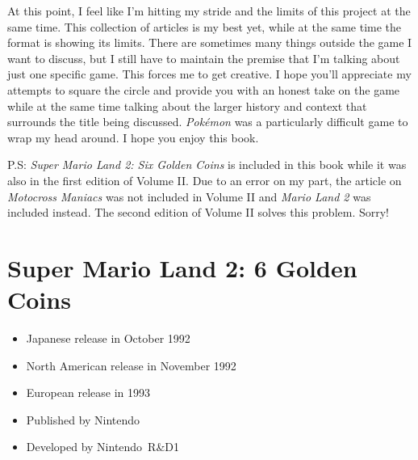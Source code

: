 \documentclass{book}
\begin{document}
At this point, I feel like I’m hitting my stride and the limits of this project at the same time. This collection of articles is my best yet, while at the same time the format is showing its limits. There are sometimes many things outside the game I want to discuss, but I still have to maintain the premise that I’m talking about just one specific game. This forces me to get creative. I hope you’ll appreciate my attempts to square the circle and provide you with an honest take on the game while at the same time talking about the larger history and context that surrounds the title being discussed. \emph{Pokémon} was a particularly difficult game to wrap my head around. I hope you enjoy this book.

P.S: \emph{Super Mario Land 2: Six Golden Coins} is included in this book while it was also in the first edition of Volume II. Due to an error on my part, the article on \emph{Motocross Maniacs} was not included in Volume II and \emph{Mario Land 2} was included instead. The second edition of Volume II solves this problem. Sorry!

















































\begingroup \chapter*{Super Mario Land 2: 6 Golden Coins} \endgroup

\begin{itemize} \setlength\itemsep{-0.4em}
\item Japanese release in October 1992
\item North American release in November 1992
\item European release in 1993
\item Published by Nintendo
\item Developed by Nintendo R\&D1
\end{itemize}\noindent
\end{document}
